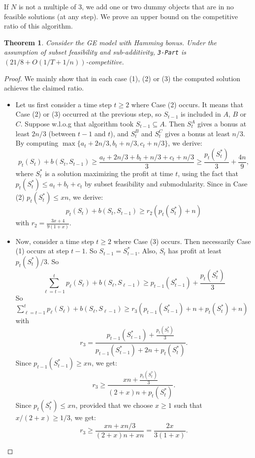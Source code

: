 \documentclass[a4paper]{book}
\newtheorem{theorem}{Theorem}[chapter]
\newtheorem{proof}{\noindent{\bf Proof.} }
\newcommand{\finalversion}[1]{#1}
\begin{document}
If $N$ is not a multiple of 3, we add one or two dummy objects that are in no feasible solutions (at any step).
We prove an upper bound on the competitive ratio of this algorithm.


\begin{theorem}\label{theo:sumod2}
Consider the GE model with Hamming bonus. Under the assumption of subset feasibility and \finalversion{sub-additivity}, \texttt{3-Part} is $(21/8+O(1/T+1/n))$-competitive.
\end{theorem}

\begin{proof}
We mainly show that in each case (1), (2) or (3) the computed solution achieves the claimed ratio.
\begin{itemize}
    \item  Let us first consider a time step $t\geq 2$ where Case (2) occurs. It means that Case (2) or (3) occurred at the previous step, so $S_{t-1}$ is included in $A$, $B$ or $C$. Suppose w.l.o.g that algorithm took $S_{t-1}\subseteq A$. Then $S^A_t$ gives a bonus at least $2n/3$ (between $t-1$ and $t$), and $S^B_t$ and  $S^C_t$ gives a bonus at least $n/3$. By computing $\max\{a_t+2n/3, b_t+n/3,c_t+n/3\}$, we derive:
\begin{equation}\nonumber
p_t(S_t)+b(S_t,S_{t-1})\geq \frac{a_t+2n/3+ b_t+n/3+c_t+n/3}{3}\geq \frac{p_t(S^*_t)}{3}+\frac{4n}{9},
\end{equation}
where $S^*_t$ is a solution maximizing the profit at time $t$, using the fact that $p_t(S^*_t)\leq a_t+b_t+c_t$ by subset feasibility and submodularity.
Since in Case (2) $p_t(S^*_t)\leq xn$, we derive:
\begin{equation}\label{eqtcas2}
p_t(S_t)+b(S_t,S_{t-1})\geq  r_2 \left(p_t(S^*_t)+n\right)
\end{equation}
with $r_2=\frac{3x+4}{9(1+x)}$.
\item Now, consider a time step $t\geq 2$ where Case (3) occurs. Then necessarily Case (1) occurs at step $t-1$. So $S_{t-1}=S^*_{t-1}$. Also, $S_t$ has profit at least $p_{t}(S^*_{t})/3$. So 
\begin{equation}\nonumber
    \sum_{\ell=t-1}^t p_\ell(S_\ell)+b(S_\ell,S_{\ell-1})\geq  p_{t-1}(S^*_{t-1}) + \frac{p_t(S^*_t)}{3}
\end{equation}
So $\sum_{\ell=t-1}^t p_\ell(S_\ell)+b(S_\ell,S_{\ell-1})\geq  r_3\left (p_{t-1}(S^*_{t-1})+n+ p_t(S^*_t)+n\right)$
with $$r_3=\frac{p_{t-1}(S^*_{t-1}) + \frac{p_t(S^*_t)}{3}}{p_{t-1}(S^*_{t-1})+2n+ p_t(S^*_t)}.$$ Since $p_{t-1}(S^*_{t-1})\geq xn$, we get:
\begin{equation}\nonumber
    r_3 \geq \frac{xn + \frac{p_t(S^*_t)}{3}}{(2+x)n+ p_t(S^*_t)}.
\end{equation}
Since $p_{t}(S^*_{t})\leq xn$, provided that we choose $x\geq 1$ such that $x/(2+x)\geq 1/3$, we get:
\begin{equation}\nonumber
    r_3 \geq \frac{xn + xn/3}{(2+x)n+ xn}=\frac{2x}{3(1+x)}.
\end{equation}


\end{itemize}
\end{proof}
\end{document}
